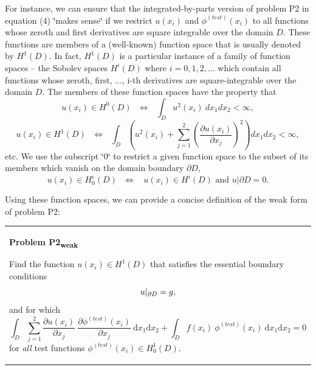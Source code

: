 For instance, we can ensure that the integrated-\/by-\/parts version of problem P2 in equation (4) \char`\"{}makes sense\char`\"{} if we restrict $u(x_i)$ and $\phi^{(test)}(x_i)$ to all functions whose zeroth and first derivatives are square integrable over the domain $D$. These functions are members of a (well-\/known) function space that is usually denoted by $H^{1}(D)$. In fact, $H^{1}(D)$ is a particular instance of a family of function spaces -- the Sobolev spaces $H^{i}(D)$ where $i=0,1,2,...$ which contain all functions whose zeroth, first, ..., i-\/th derivatives are square-\/integrable over the domain $D$. The members of these function spaces have the property that \[ u(x_i) \in H^0(D) \ \ \ \iff \ \ \ \int_D u^2(x_i) \ dx_1 dx_2 < \infty, \] \[ u(x_i) \in H^1(D) \ \ \ \iff \ \ \ \int_D \left( u^2(x_i) + \sum_{j=1}^2 \left(\frac{\partial u(x_i)}{\partial x_j}\right)^2 \right) dx_1 dx_2 < \infty, \] etc. We use the subscript \char`\"{}0\char`\"{} to restrict a given function space to the subset of its members which vanish on the domain boundary $ \partial D,$ \[ u(x_i) \in H^i_0(D) \ \ \ \iff \ \ \ \ u(x_i) \in H^i(D) \mbox{\ \ \ and \ \ \ } u|{\partial D}=0. \]

Using these function spaces, we can provide a concise definition of the weak form of problem P2\+: \begin{center} \tabulinesep=1mm
\begin{longtabu} spread 0pt [c]{*{1}{|X[-1]}|}
\hline
\begin{center} {\bfseries  Problem P2\textsubscript{weak} } \end{center} 

\begin{center} Find the function $ u(x_i) \in H^1(D) $ that satisfies the essential boundary conditions \[ \hfill u|_{\partial D} = g, \] and for which \[ \int_D \sum_{j=1}^2 \frac{\partial u(x_i)}{\partial x_j} \ \frac{\partial \phi^{(test)}(x_i)}{\partial x_j} \ \mbox{d}x_1 \mbox{d}x_2 + \int_D f(x_i) \ \phi^{(test)}(x_i) \ \mbox{d}x_1 \mbox{d}x_2 = 0 \] for {\itshape all} test functions $ \phi^{(test)}(x_i) \in H^1_0(D). $ \end{center}    \\
\end{longtabu}
\end{center} 

